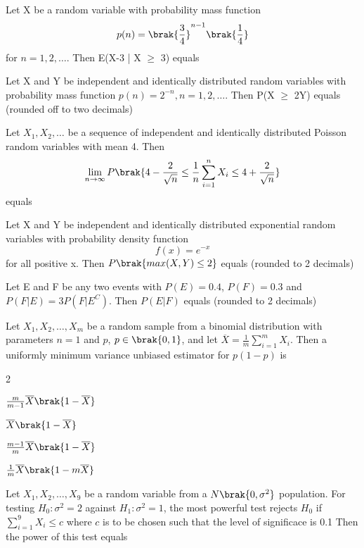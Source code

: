 	\item Let X be a random variable with probability mass function 
		$$ p(n) = \brak{\frac{3}{4}}^{n-1} \brak{\frac{1}{4}} $$ for $n = 1, 2, \dots $. Then E(X-3 | X $\geq$ 3) equals
	\item Let X and Y be independent and identically distributed random variables with probability mass function $p(n) = 2^{-n}, n=1,2,\dots$. Then P(X $\geq$ 2Y) equals (rounded off to two decimals)
	\item Let $X_1, X_2, \dots$ be a sequence of independent and identically distributed Poisson random variables with mean 4. Then 
		$$ \lim_{n \to \infty} P \brak{4 - \frac{2}{\sqrt{n}} \leq \frac{1}{n} \sum_{i=1}^{n} X_i \leq 4 + \frac{2}{\sqrt{n}}} $$ equals
	\item Let X and Y be independent and identically distributed exponential random variables with probability density function 
		$$ f(x) = e^{-x} $$ for all positive x. Then $P \brak{max(X,Y) \leq 2} $ equals (rounded to 2 decimals)
	\item Let E and F be any two events with $P(E) = 0.4$, $P(F) = 0.3$ and $P(F|E) = 3P(F|E^C)$. Then $P(E|F)$ equals (rounded to 2 decimals)
	\item Let $X_1, X_2, \dots, X_m$ be a random sample from a binomial distribution with parameters $n=1$ and $p$, $p \in \brak{0,1}$, and let $\overline{X} = \frac{1}{m} \sum_{i=1}^{m} X_i$. Then a uniformly minimum variance unbiased estimator for $p(1-p)$ is
		\begin{enumerate}
		\end{enumerate}
	\item Let $X_1, X_2, \dots, X_9$ be a random variable from a $N \brak{0, \sigma ^2}$ population. For testing $H_0 : \sigma ^2 = 2$ against $H_1 : \sigma ^2 = 1$, the most  powerful test rejects $H_0$ if $\sum_{i=1}^{9} X_i \leq c $ where $c$ is to be chosen such that the level of significace is 0.1 Then the power of this test equals

